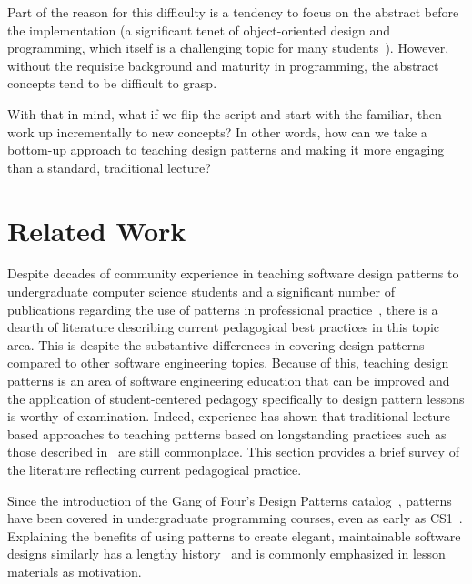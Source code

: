 \documentclass[conference]{IEEEtran}
\begin{document}
Part of the reason for this difficulty is a tendency to focus on the abstract before the implementation (a significant tenet of object-oriented design and programming, which itself is a challenging topic for many students~\cite{hadar2008}). However, without the requisite background and maturity in programming, the abstract concepts tend to be difficult to grasp.

With that in mind, what if we flip the script and start with the familiar, then work up incrementally to new concepts? In other words, how can we take a bottom-up approach to teaching design patterns and making it more engaging than a standard, traditional lecture?

\section{Related Work}

Despite decades of community experience in teaching software design patterns to undergraduate computer science students and a significant number of publications regarding the use of patterns in professional practice~\cite{lartigue2018}, there is a dearth of literature describing current pedagogical best practices in this topic area. This is despite the substantive differences in covering design patterns compared to other software engineering topics. Because of this, teaching design patterns is an area of software engineering education that can be improved and the application of student-centered pedagogy specifically to design pattern lessons is worthy of examination. Indeed, experience has shown that traditional lecture-based approaches to teaching patterns based on longstanding practices such as those described in~\cite{christensen2004, clancy1999, dewan2005, proulx2000, stuurman2004} are still commonplace. This section provides a brief survey of the literature reflecting current pedagogical practice.

Since the introduction of the Gang of Four's Design Patterns catalog~\cite{gamma1994}, patterns have been covered in undergraduate programming courses, even as early as CS1~\cite{wallingford1996}. Explaining the benefits of using patterns to create elegant, maintainable software designs similarly has a lengthy history~\cite{schmidt1995} and is commonly emphasized in lesson materials as motivation.
\end{document}
